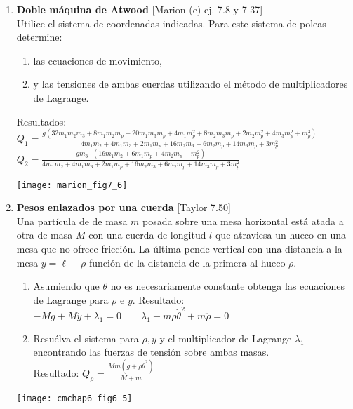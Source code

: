 \documentclass[11pt, spanish, a4paper, twoside]{article}
\begin{document}
\begin{enumerate}
	
	\item
	\begin{minipage}[t][6.5cm]{0.65\textwidth}
	\textbf{Doble máquina de Atwood} [Marion (e) ej. 7.8 y 7-37]\\
	Utilice el sistema de coordenadas indicadas.
	Para este sistema de poleas determine: 
	\begin{enumerate}
		\item las ecuaciones de movimiento,
		\item y las tensiones de ambas cuerdas utilizando el método de multiplicadores de Lagrange.
	\end{enumerate}
	Resultados:\\
	\(
		Q_{1} = \frac{g \left(32 m_{1} m_{2} m_{3} + 8 m_{1} m_{2} m_{p} + 20 m_{1} m_{3} m_{p} + 4 m_{1} m_{p}^{2} + 8 m_{2} m_{3} m_{p} + 2 m_{2} m_{p}^{2} + 4 m_{3} m_{p}^{2} + m_{p}^{3}\right)}{4 m_{1} m_{2} + 4 m_{1} m_{3} + 2 m_{1} m_{p} + 16 m_{2} m_{3} + 6 m_{2} m_{p} + 14 m_{3} m_{p} + 3 m_{p}^{2}}
	\)\\
	\(
		Q_{2} = \frac{g m_{3} \cdot \left(16 m_{1} m_{2} + 6 m_{1} m_{p} + 4 m_{2} m_{p} - m_{p}^{2}\right)}{4 m_{1} m_{2} + 4 m_{1} m_{3} + 2 m_{1} m_{p} + 16 m_{2} m_{3} + 6 m_{2} m_{p} + 14 m_{3} m_{p} + 3 m_{p}^{2}}
	\)
	\end{minipage}
	\begin{minipage}[c][0.5cm][t]{0.3\textwidth}
		\texttt{[image: marion\_fig7\_6]}
	\end{minipage}


	\item
	\begin{minipage}[t][6cm]{0.65\textwidth}
		\textbf{Pesos enlazados por una cuerda} [Taylor 7.50]\\
		Una partícula de de masa \(m\) posada sobre una mesa horizontal está atada a otra de masa \(M\) con una cuerda de longitud \(l\) que atraviesa un hueco en una mesa que no ofrece fricción.
		La última pende vertical con una distancia a la mesa \(y = \ell - \rho\) función de la distancia de la primera al hueco \(\rho\).
		\begin{enumerate}
			\item Asumiendo que \(\theta\) no es necesariamente constante obtenga las ecuaciones de Lagrange para \(\rho\) e  \(y\). Resultado:\\ \(- M g + M \ddot{y} + \lambda_{1} = 0 \qquad \lambda_{1} - m \rho \dot{\theta}^{2} + m \ddot{\rho} = 0\)
			\item Resuélva el sistema para \(\rho, y\) y el multiplicador de Lagrange \(\lambda_1\) encontrando las fuerzas de tensión sobre ambas masas.\\
			Resultado: \(Q_{\rho} = \frac{M m \left(g + \rho \dot{\theta}^{2}\right)}{M + m}\)
		\end{enumerate}
	\end{minipage}
	\begin{minipage}[c][0cm][t]{0.3\textwidth}
		\texttt{[image: cmchap6\_fig6\_5]}
	\end{minipage}



\end{enumerate}
\end{document}
